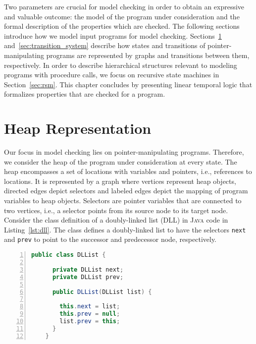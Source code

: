 \documentclass[a4paper, 12pt, twoside]{report}
\begin{document}
	Two parameters are crucial for model checking in order to obtain an expressive and valuable outcome: the model of the program under consideration and the formal description of the properties which are checked. The following sections introduce how we model input programs for model checking. Sections~\ref{sec:heap} and~\ref{sec:transition_system} describe how states and transitions of pointer-manipulating programs are represented by graphs and transitions between them, respectively. In order to describe hierarchical structures relevant to modeling programs with procedure calls, we focus on recursive state machines in Section~\ref{sec:rsm}. This chapter concludes by presenting linear temporal logic that formalizes properties that are checked for a program.
	
	\section{Heap Representation}\label{sec:heap}
	
	Our focus in model checking lies on pointer-manipulating programs. Therefore, we consider the heap of the program under consideration at every state. The heap encompasses a set of locations with variables and pointers, i.e., references to locations. It is represented by a graph where vertices represent heap objects, directed edges depict selectors and labeled edges depict the mapping of program variables to heap objects. Selectors are pointer variables that are connected to two vertices, i.e., a selector points from its source node to its target node.\\
	
	Consider the class definition of a doubly-linked list (DLL) in \textsc{Java} code in Listing~\ref{lst:dll}. The class defines a doubly-linked list to have the selectors \texttt{next} and \texttt{prev} to point to the successor and predecessor node, respectively. 
	
	\begin{lstlisting}[language=Java,numbers=left,
	stepnumber=1,keywordstyle=\color{blue},frame=single,caption={\textsc{Java} class definition for doubly-linked lists.},captionpos=b,label={lst:dll}]
	public class DLList {
	
	  private DLList next;
	  private DLList prev;
	
	  public DLList(DLList list) {
	
	    this.next = list;
	    this.prev = null;
	    list.prev = this;
	  }
	}
	\end{lstlisting}
	
\end{document}
